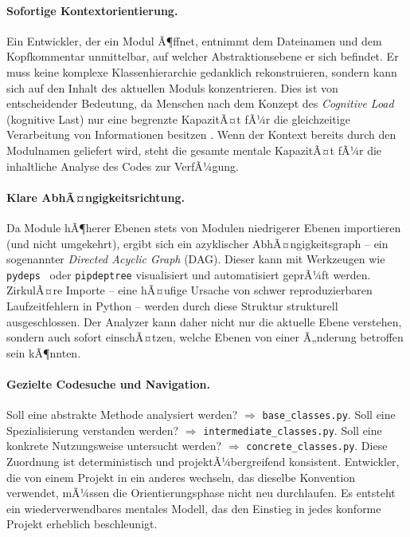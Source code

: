 ﻿\documentclass[a4paper,12pt]{article}
\begin{document}
\paragraph{Sofortige Kontextorientierung.}
Ein Entwickler, der ein Modul Ã¶ffnet, entnimmt dem Dateinamen und dem Kopfkommentar
unmittelbar, auf welcher Abstraktionsebene er sich befindet. Er muss keine
komplexe Klassenhierarchie gedanklich rekonstruieren, sondern kann sich auf den
Inhalt des aktuellen Moduls konzentrieren. Dies ist von entscheidender Bedeutung,
da Menschen nach dem Konzept des \textit{Cognitive Load} (kognitive Last) nur eine
begrenzte KapazitÃ¤t fÃ¼r die gleichzeitige Verarbeitung von Informationen besitzen
\cite{sweller1988}. Wenn der Kontext bereits durch den Modulnamen geliefert wird,
steht die gesamte mentale KapazitÃ¤t fÃ¼r die inhaltliche Analyse des Codes zur
VerfÃ¼gung.

\paragraph{Klare AbhÃ¤ngigkeitsrichtung.}
Da Module hÃ¶herer Ebenen stets von Modulen niedrigerer Ebenen importieren (und
nicht umgekehrt), ergibt sich ein azyklischer AbhÃ¤ngigkeitsgraph -- ein
sogenannter \textit{Directed Acyclic Graph} (DAG). Dieser kann mit Werkzeugen
wie \texttt{pydeps}~\cite{pydeps2024} oder \texttt{pipdeptree} visualisiert und
automatisiert geprÃ¼ft werden. ZirkulÃ¤re Importe -- eine hÃ¤ufige Ursache von
schwer reproduzierbaren Laufzeitfehlern in Python -- werden durch diese Struktur
strukturell ausgeschlossen. Der Analyzer kann daher nicht nur die aktuelle Ebene
verstehen, sondern auch sofort einschÃ¤tzen, welche Ebenen von einer Ã„nderung
betroffen sein kÃ¶nnten.

\paragraph{Gezielte Codesuche und Navigation.}
Soll eine abstrakte Methode analysiert werden? $\Rightarrow$ \texttt{base\_classes.py}.
Soll eine Spezialisierung verstanden werden? $\Rightarrow$ \texttt{intermediate\_clas\newline ses.py}.
Soll eine konkrete Nutzungsweise untersucht werden? $\Rightarrow$ \texttt{concrete\_classes.py}.
Diese Zuordnung ist deterministisch und projektÃ¼bergreifend konsistent. Entwickler,
die von einem Projekt in ein anderes wechseln, das dieselbe Konvention verwendet,
mÃ¼ssen die Orientierungsphase nicht neu durchlaufen. Es entsteht ein wiederverwendbares
mentales Modell, das den Einstieg in jedes konforme Projekt erheblich beschleunigt.
\end{document}
